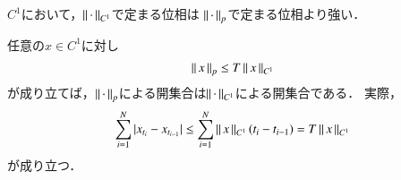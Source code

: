 \begin{screen}
	\begin{thm}
		$C^1$において，$\left\|\, \cdot\, \right\|_{C^1}$で定まる位相は
		$\left\|\, \cdot\, \right\|_{p}$で定まる位相より強い．
	\end{thm}
\end{screen}

\begin{prf}
	任意の$x \in C^1$に対し
	\begin{align}
		\left\|\, x\, \right\|_{p} \leq T \left\|\, x\, \right\|_{C^1}
	\end{align}
	が成り立てば，$\left\|\, \cdot\, \right\|_{p}$による開集合は$\left\|\, \cdot\, \right\|_{C^1}$による開集合である．
	実際，
	\begin{align}
		\sum_{i=1}^{N} |x_{t_i} - x_{t_{i-1}}|
		\leq \sum_{i=1}^{N} \left\|\, x\, \right\|_{C^1} (t_i - t_{i-1})
		= T \left\|\, x\, \right\|_{C^1}
	\end{align}
	が成り立つ．
	\QED
\end{prf}